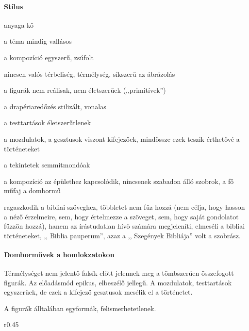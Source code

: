 		\paragraph{Stílus}
		\begin{compactitem}
			\item anyaga kő
			\item a téma mindig vallásos
			\item a kompozíció egyszerű, zsúfolt
			\item nincsen valós térbeliség, térmélység, síkszerű az ábrázolás
			\item a figurák nem reálisak, nem életszerűek (,,primitívek”)
			\item a drapériaredőzés stilizált, vonalas
			\item a testtartások életszerűtlenek
			\item a mozdulatok, a gesztusok viszont kifejezőek, mindössze ezek teszik érthetővé a történeteket
			\item a tekintetek semmitmondóak
			\item a kompozíció az épülethez kapcsolódik, nincsenek szabadon álló szobrok, a fő műfaj a dombormű
			\item ragaszkodik a bibliai szöveghez, többletet nem fűz hozzá (nem célja, hogy hasson a néző érzelmeire, sem, hogy értelmezze a szöveget, sem, hogy saját gondolatot fűzzön hozzá), hanem az írástudatlan hívő számára megjeleníti, elmeséli a bibliai történeteket, ,, Biblia pauperum”, azaz a ,, Szegények Bibliája” volt a szobrász.
		\end{compactitem}
		
		\paragraph{Domborművek a homlokzatokon}
		Térmélységet nem jelentő falsík előtt jelennek meg a tömbszerűen összefogott figurák. Az előadásmód epikus, elbeszélő jellegű. A mozdulatok, testtartások egyszerűek, de ezek a kifejező gesztusok mesélik el a történetet.
		
		A figurák álltalában egyformák, felismerhetetlenek.
		
		\begin{wrapfigure}{r}{0.45\textwidth}
		\end{wrapfigure}
		
